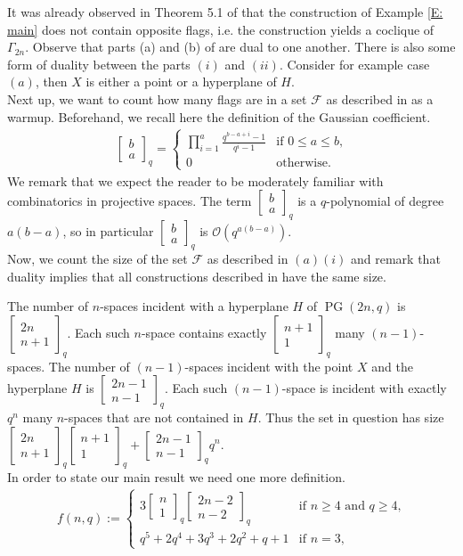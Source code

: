 \documentclass[11pt, oneside, a4paper]{article}
\newcommand{\EKR}{\mathcal{F}}
\newcommand{\OO}{\mathcal{O}}
\newcommand{\Gauss}[2]{{\begin{bmatrix} #1 \\ #2 \end{bmatrix}_q}}
\DeclareMathOperator{\PG}{PG}
\begin{document}
It was already observed in Theorem 5.1 of \cite{cocliquesonlineplane4d} that the construction of Example \ref{E: main} does not contain opposite flags, i.e. the construction yields a coclique of $\Gamma_{2n}$.
Observe that parts (a) and (b) of  are dual to one another.
There is also some form of duality between the parts $(i)$ and $(ii)$. Consider for example case $(a)$, then $X$ is either a point or a hyperplane of $H$.\\
Next up, we want to count how many flags are in a set $\EKR$ as described in  as a warmup.
Beforehand, we recall here the definition of the Gaussian coefficient. 
 \begin{align*}
 \Gauss{b}{a}=
 \begin{cases}
\displaystyle \prod_{i=1}^a\frac{q^{b-a+i}-1}{q^i-1} & \text{if $0\le a\le b$,}
\\
0 & \text{otherwise.} \end{cases}
\end{align*}
We remark that we expect the reader to be moderately familiar with combinatorics in projective spaces. The term $\Gauss{b}{a}$ is a $q$-polynomial of degree $a(b-a)$, so in particular $\Gauss{b}{a}$ is $\OO(q^{a(b-a)})$.\\
Now, we count the size of the set $\EKR$ as described in  $(a)(i)$ and remark that duality implies that all constructions described in  have the same size.

The number of $n$-spaces incident with a hyperplane $H$ of $\PG(2n,q)$ is $\Gauss{2n}{n+1}$. Each such $n$-space contains exactly $\Gauss{n+1}{1}$ many $(n-1)$-spaces. The number of $(n-1)$-spaces incident with the point $X$ and the hyperplane $H$ is $\Gauss{2n-1}{n-1}$. Each such $(n-1)$-space is incident with exactly $q^n$ many $n$-spaces that are not contained in $H$. Thus the set in question has size $\Gauss{2n}{n+1} \Gauss{n+1}{1} +\Gauss{2n-1}{n-1}q^n$. \\

In order to state our main result we need one more definition.
\begin{align*}
f(n,q):=\left\{\begin{array}{ll}
3\Gauss{n}{1}\Gauss{2n-2}{n-2} & \text{if $n\geq 4$ and $q\geq 4$,}
\\
q^5+2q^4+3q^3+2q^2+q+1 &  \text{if $n=3$,}
\end{array}
\right.
\end{align*}
\end{document}

